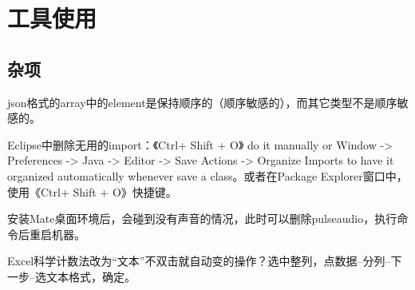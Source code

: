 \section{工具使用}
\subsection{杂项}
\par json格式的array中的element是保持顺序的（顺序敏感的），而其它类型不是顺序敏感的。
\par Eclipse中删除无用的import：《Ctrl+ Shift + O》 do it manually or Window -> Preferences -> Java -> Editor -> Save Actions -> Organize Imports to have it organized automatically whenever save a class。或者在Package Explorer窗口中，使用《Ctrl+ Shift + O》快捷键。
\par 安装Mate桌面环境后，会碰到没有声音的情况，此时可以删除pulseaudio，执行命令后重启机器。
\par Excel科学计数法改为“文本”不双击就自动变的操作？选中整列，点数据--分列--下一步--选文本格式，确定。
